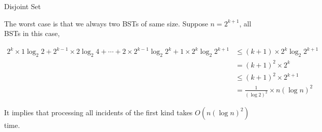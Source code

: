 \begin{homeworkProblem}{Disjoint Set}
\begin{enumerate}[label=(\arabic*)]
            The worst case is that we always  two BSTs of same size. 
            Suppose $n = 2^{k+1}$,  all BSTs in this case, 

            \begin{align*}
                2^k \times 1 \log_2{2} + 2^{k-1} \times 2 \log_2{4} + \cdots + 2 \times2^{k-1} \log_2{2^k} + 1 \times 2^k \log_2{2^{k+1}} &\leq (k+1) \times 2^k \log_2{2^{k+1}}  \\
                &= (k+1)^2 \times 2^k \\
                &\leq (k+1)^2 \times 2^{k+1} \\
                &= \frac{1}{(\log2)^2} \times n (\log n)^2
            \end{align*}

            It implies that processing all incidents of the first kind takes $O(n(\log n)^2)$ time.

    \end{enumerate}
\end{homeworkProblem}


